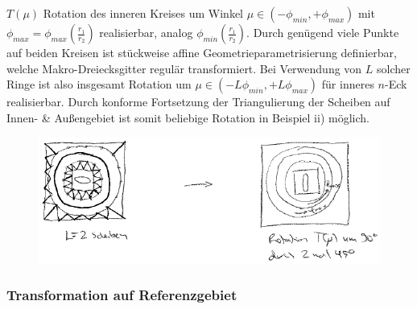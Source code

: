 \begin{enumerate}
		$T(\mu)$ Rotation des inneren Kreises um Winkel $\mu \in (-\phi_{min},+\phi_{max})$ mit $\phi_{max}=\phi_{max}(\frac{r_1}{r_2})$ realisierbar, analog $\phi_{min}(\frac{r_1}{r_2})$.
		Durch genügend viele Punkte auf beiden Kreisen ist stückweise affine Geometrieparametrisierung definierbar, welche Makro-Dreiecksgitter regulär transformiert.
		Bei Verwendung von $L$ solcher Ringe ist also insgesamt Rotation um $\mu \in (-L\phi_{min},+L\phi_{max})$ für inneres $n$-Eck realisierbar.
		Durch konforme Fortsetzung der Triangulierung der Scheiben auf Innen- \& Außengebiet ist somit beliebige Rotation in Beispiel ii) möglich.

		\begin{figure}[H]
			\centering\small
			\includegraphics[width = 0.75 \textwidth]{Bilder/affine-trafo4.png}
		\end{figure}
\end{enumerate}

\subsubsection*{Transformation auf Referenzgebiet}


